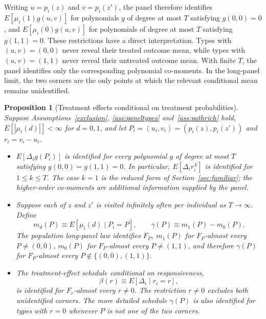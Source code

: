 \documentclass[11pt]{article}
\newtheorem{proposition}{Proposition}
\newcommand{\1}{\mathbf{1}}
\begin{document}
Writing $u=p_i(z)$ and $v=p_i(z')$, the panel therefore identifies
$E[\mu_i(1)g(u,v)]$ for polynomials $g$ of degree at most $T$ satisfying
$g(0,0)=0$, and $E[\mu_i(0)g(u,v)]$ for polynomials of degree at most $T$
satisfying $g(1,1)=0$. These restrictions have a direct interpretation. Types
with $(u,v)=(0,0)$ never reveal their treated outcome mean, while types with
$(u,v)=(1,1)$ never reveal their untreated outcome mean. With finite $T$, the
panel identifies only the corresponding polynomial co-moments. In the
long-panel limit, the two corners are the only points at which the relevant
conditional mean remains unidentified.

\begin{proposition}[Treatment effects conditional on treatment probabilities]
\label{prop:paneloutcomes}
Suppose Assumptions~\ref{exclusion}, \ref{ass:paneltypes}
and~\ref{ass:pathrich} hold, $E[|\mu_i(d)|]<\infty$ for $d=0,1$, and let
$P_i=(u_i,v_i)=(p_i(z),p_i(z'))$ and $r_i=v_i-u_i$.
\begin{itemize}
\item[(a)] $E[\Delta_i g(P_i)]$ is identified for every polynomial $g$ of
degree at most $T$ satisfying $g(0,0)=g(1,1)=0$. In particular,
$E[\Delta_i r_i^{\,k}]$ is identified for $1\leq k\leq T$. The case $k=1$
is the reduced form of Section~\ref{sec:familiar}; the higher-order
co-moments are additional information supplied by the panel.
\item[(b)] Suppose each of $z$ and $z'$ is visited infinitely often per
individual as $T\to\infty$. Define
\[
m_d(P)\equiv E[\mu_i(d)\mid P_i=P],
\qquad
\gamma(P)\equiv m_1(P)-m_0(P).
\]
The population long-panel law identifies $F_P$, $m_1(P)$ for
$F_P$-almost every $P\neq(0,0)$, $m_0(P)$ for $F_P$-almost every
$P\neq(1,1)$, and therefore $\gamma(P)$ for $F_P$-almost every
$P\notin\{(0,0),(1,1)\}$.
\item[(c)] The treatment-effect schedule conditional on responsiveness,
\[
\beta(r)\equiv E[\Delta_i\mid r_i=r],
\]
is identified for $F_r$-almost every $r\neq0$. The restriction $r\neq0$
excludes both unidentified corners. The more detailed schedule $\gamma(P)$ is
also identified for types with $r=0$ whenever $P$ is not one of the two
corners.
\end{itemize}
\end{proposition}
\end{document}
